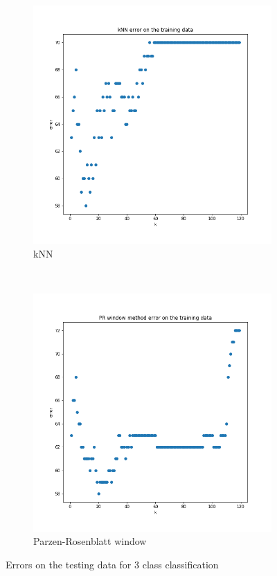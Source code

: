 \documentclass{article}
\begin{document}
\begin{figure}[t]
    \centering
    \begin{subfigure}[b]{0.5\textwidth}
        \centering
        \includegraphics[width=\linewidth]{kNN-mclass}
        \caption{kNN}
    \end{subfigure}%
    ~ 
    \begin{subfigure}[b]{0.5\textwidth}
        \centering
        \includegraphics[width=\linewidth]{pr_mclass}
        \caption{Parzen-Rosenblatt window}
    \end{subfigure}
    \caption{Errors on the testing data for 3 class classification}
\end{figure}
\end{document}

